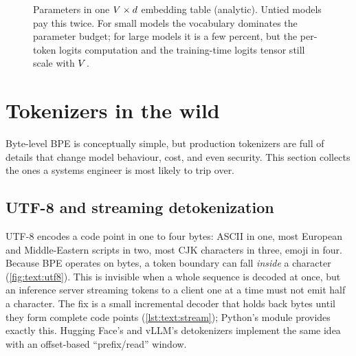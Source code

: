 \begin{figure}[t]
\centering
{}
\caption{Parameters in one $V\times d$ embedding table (analytic). Untied models pay this twice.
For small models the vocabulary dominates the parameter budget; for large models it is a few
percent, but the per-token logits computation and the training-time logits tensor still scale
with $V$.}
\label{fig:text:vocabcost}
\end{figure}


\section{Tokenizers in the wild}\label{sec:text:wild}

Byte-level BPE is conceptually simple, but production tokenizers are full of details that change
model behaviour, cost, and even security. This section collects the ones a systems engineer is
most likely to trip over.

\subsection{UTF-8 and streaming detokenization}
UTF-8 encodes a code point in one to four bytes: ASCII in one, most European and Middle-Eastern
scripts in two, most CJK characters in three, emoji in four. Because BPE operates on bytes, a token
boundary can fall \emph{inside} a character (\cref{fig:text:utf8}). This is invisible when a whole
sequence is decoded at once, but an inference server streaming tokens to a client one at a time must
not emit half a character. The fix is a small incremental decoder that holds back bytes until they
form complete code points (\cref{lst:text:stream}); Python's  module provides exactly
this. Hugging Face's and vLLM's detokenizers implement the same idea with an offset-based
``prefix/read'' window.

